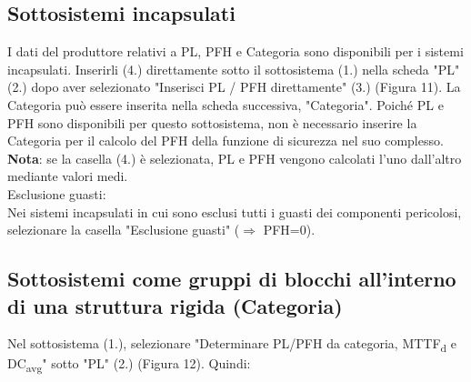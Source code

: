 \documentclass[a4paper,11pt]{article}
\begin{document}
    \subsection{Sottosistemi incapsulati} %
    I dati del produttore relativi a PL, PFH e Categoria sono disponibili per i sistemi incapsulati. Inserirli (4.) direttamente sotto il sottosistema (1.) nella scheda "PL" (2.) dopo aver selezionato "Inserisci PL / PFH direttamente" (3.) (Figura 11). La Categoria può essere inserita nella scheda successiva, "Categoria". Poiché PL e PFH sono disponibili per questo sottosistema, non è necessario inserire la Categoria per il calcolo del PFH della funzione di sicurezza nel suo complesso.\\
    \textbf{Nota}: se la casella (4.) è selezionata, PL e PFH vengono calcolati l'uno dall'altro mediante valori medi.\\
    Esclusione guasti:\\
    Nei sistemi incapsulati in cui sono esclusi tutti i guasti dei componenti pericolosi, selezionare la casella "Esclusione guasti" ($\Rightarrow$ PFH=0).

    \subsection{Sottosistemi come gruppi di blocchi all'interno di una struttura rigida (Categoria)} %
    Nel sottosistema (1.), selezionare "Determinare PL/PFH da categoria, MTTF\textsubscript{d} e DC\textsubscript{avg}" sotto "PL" (2.) (Figura 12).
    Quindi:\\

    
\end{document}
